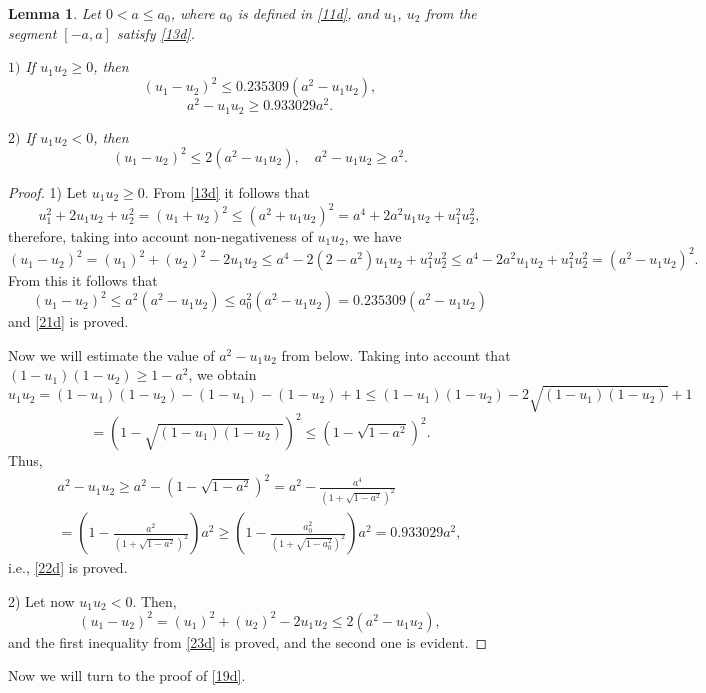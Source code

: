 \documentclass[12pt,a4paper]{amsart}
\newtheorem{lemma}{Lemma}
\begin{document}
\begin{lemma}\label{l5}
Let $0<a\le a_0$, where $a_0$ is defined in \eqref{11d}, and $u_1$,
$u_2$ from the segment $[-a,a]$ satisfy \eqref{13d}.

$1)$ If $u_1u_2\ge 0$, then
\begin{equation}\label{21d}
(u_1-u_2)^2\le
0.235309(a^2-u_1u_2),
\end{equation}
\begin{equation}\label{22d}
a^2-u_1u_2\ge
0.933029 a^2.
\end{equation}

$2)$ If $u_1u_2< 0$, then
\begin{equation}\label{23d}
(u_1-u_2)^2\le 2(a^2-u_1u_2), \quad a^2-u_1u_2\ge a^2.
\end{equation}
\end{lemma}

\begin{proof}
1) Let $u_1u_2\ge 0$.
From \eqref{13d} it follows that
$$
u_1^2+2u_1u_2+ u_2^2=(u_1+u_2)^2\le (a^2+u_1u_2)^2=a^4+2a^2u_1u_2+u_1^2u_2^2,
$$
therefore, taking into account non-negativeness of $u_1u_2$, we have
$$
(u_1-u_2)^2=(u_1)^2+(u_2)^2-2u_1u_2\le a^4-2(2-a^2)u_1u_2+u_1^2u_2^2\le a^4-2a^2u_1u_2+u_1^2u_2^2=
(a^2-u_1u_2)^2.
$$
From this it follows that
\begin{equation*} (u_1-u_2)^2\le
a^2(a^2-u_1u_2)\le  a_0^2(a^2-u_1u_2)=0.235309(a^2-u_1u_2)
\end{equation*}
and  \eqref{21d} is proved.

Now we will estimate the value of $a^2-u_1u_2$ from below. Taking
into account that $(1-u_1)(1-u_2)\ge 1-a^2$, we obtain
$$
u_1u_2=(1-u_1)(1-u_2)-(1-u_1)-(1-u_2)+1\le (1-u_1)(1-u_2)-2\sqrt{(1-u_1)(1-u_2)}+1$$$$=(1-\sqrt{(1-u_1)(1-u_2)})^2\le(1-\sqrt{1-a^2})^2.
$$
Thus, \begin{multline*}
a^2-u_1u_2\ge a^2-(1-\sqrt{1-a^2})^2= a^2-\frac{a^4}{(1+\sqrt{1-a^2})^2}\\
=\left(1-\frac{a^2}{(1+\sqrt{1-a^2})^2}\right)a^2\ge\left(1-\frac{a_0^2}{(1+\sqrt{1-a_0^2})^2}\right)a^2=0.933029 a^2,
\end{multline*}
i.e., \eqref{22d} is proved.

2) Let now $u_1u_2< 0$. Then,
$$
(u_1-u_2)^2=(u_1)^2+(u_2)^2-2u_1u_2\le 2(a^2-u_1u_2),
$$
and the first inequality from \eqref{23d} is proved, and the second one is evident.
\end{proof}

Now we will turn to the proof of \eqref{19d}.
\end{document}
